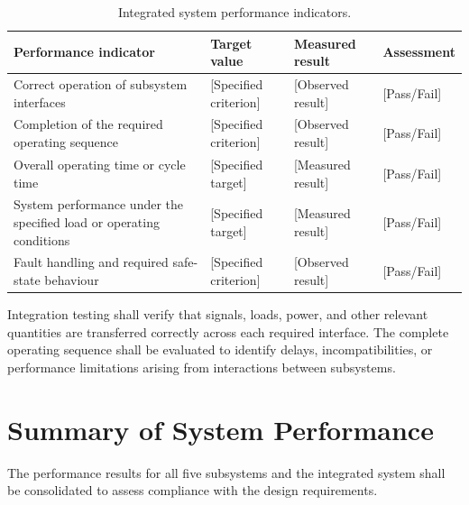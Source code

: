 \begin{table}[H]
    \centering
    \caption{Integrated system performance indicators.}
    \label{tab:integrated-performance}
    \renewcommand{\arraystretch}{1.4}
    \begin{tabularx}{\textwidth}{|X|X|X|X|}
        \hline
        \textbf{Performance indicator} &
        \textbf{Target value} &
        \textbf{Measured result} &
        \textbf{Assessment} \\
        \hline
        Correct operation of subsystem interfaces &
        [Specified criterion] &
        [Observed result] &
        [Pass/Fail] \\
        \hline
        Completion of the required operating sequence &
        [Specified criterion] &
        [Observed result] &
        [Pass/Fail] \\
        \hline
        Overall operating time or cycle time &
        [Specified target] &
        [Measured result] &
        [Pass/Fail] \\
        \hline
        System performance under the specified load
        or operating conditions &
        [Specified target] &
        [Measured result] &
        [Pass/Fail] \\
        \hline
        Fault handling and required safe-state behaviour &
        [Specified criterion] &
        [Observed result] &
        [Pass/Fail] \\
        \hline
    \end{tabularx}
\end{table}

Integration testing shall verify that signals, loads, power, and
other relevant quantities are transferred correctly across each
required interface. The complete operating sequence shall be
evaluated to identify delays, incompatibilities, or performance
limitations arising from interactions between subsystems.

\section{Summary of System Performance}
\label{sec:system-performance-summary}

The performance results for all five subsystems and the integrated
system shall be consolidated to assess compliance with the design
requirements.


